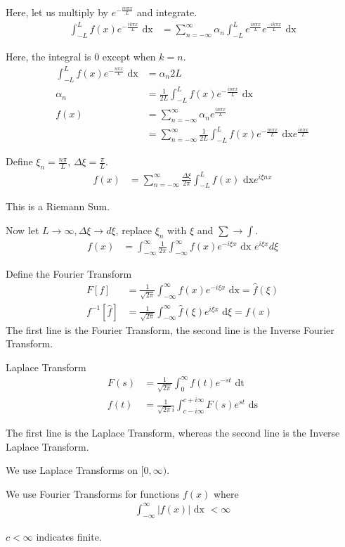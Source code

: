 \documentclass{article}
\begin{document}
Here, let us multiply by $e^{-\frac{i n \pi x}{L}}$ and integrate.
%
\begin{align}
  \int^L_{-L} f(x)e^{-\frac{i k \pi x}{L}} \text{ dx} & =
  \sum^\infty_{n = -\infty} \alpha_n \int^L_{-L} e^{\frac{i n \pi x}{L}} e^{\frac{-i k \pi x}{L}} \text{ dx}
\end{align}

Here, the integral is $0$ except when $k = n$.
%
\begin{align}
  \int^L_{-L} f(x) e^{- \frac{n \pi x}{L}} \text{ dx} & = \alpha_n 2L\\
  \alpha_n & = \frac{1}{2L} \int^L_{-L} f(x)e^{-\frac{i n \pi x}{L}} \text{ dx}\\
  f(x) & = \sum^\infty_{n = -\infty} \alpha_n e^{\frac{i n \pi x}{L}}\\
  & = \sum^\infty_{n = -\infty} \frac{1}{2L} \int^L_{-L} f(x) e^{- \frac{i n \pi x}{L}} \text{ dx} e^{\frac{i n \pi x}{L}}
\end{align}


Define $\xi_n = \frac{n \pi}{L}$, $\Delta \xi = \frac{\pi}{L}$.
%
\begin{align}
  f(x) & = \sum^\infty_{n = -\infty} \frac{\Delta \xi}{2 \pi} \int^L_{-L} f(x) \text{ dx} e^{i \xi n x}
\end{align}

This is a Riemann Sum.

Now let $L \to \infty, \Delta \xi \to d \xi$, replace $\xi_n$ with $\xi$ and $\sum \rightarrow \int$.
%
\begin{align}
  f(x) & = \int^\infty_{-\infty} \frac{1}{2 \pi} \int^\infty_{-\infty} f(x) e^{-i \xi x} \text{ dx } e^{i \xi x} d\xi
\end{align}

Define the Fourier Transform
%
\begin{align}
  F[f] & = \frac{1}{\sqrt {2 \pi}} \int^\infty_{- \infty} f(x) e^{-i \xi x} \text{ dx} = \hat f(\xi)\\
  f^{-1}[\hat f] & = \frac{1}{\sqrt{2 \pi}} \int^\infty_{- \infty} \hat f(\xi) e^{i \xi x} \text{ d}\xi = f(x)
\end{align}
The first line is the Fourier Transform, the second line is the Inverse Fourier Transform.

\note Laplace Transform
%
\begin{align}
  F(s) & = \frac{1}{\sqrt{2 \pi}} \int^\infty_0 f(t) e^{-st} \text{ dt}\\
  f(t) & = \frac{1}{\sqrt{2 \pi} i} \int^{c + i \infty}_{c - i\infty} F(s)e^{st} \text{ ds}
\end{align}

The first line is the Laplace Transform, whereas the second line is the Inverse Laplace Transform.

We use Laplace Transforms on $[0, \infty)$.

\note We use Fourier Transforms for functions $f(x)$ where
%
\begin{align}
  \int^\infty_{-\infty} |f(x)| \text{ dx } < \infty
\end{align}

\note $c < \infty$ indicates finite.
\end{document}
